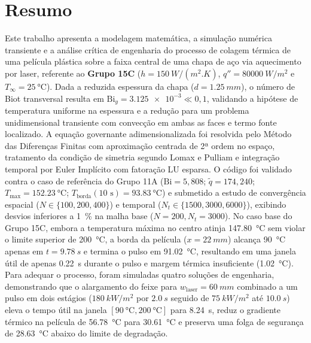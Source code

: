 \documentclass[11pt,a4paper]{article}
\begin{document}
\section{Resumo}
Este trabalho apresenta a modelagem matemática, a simulação numérica transiente e a análise crítica de engenharia do processo de colagem térmica de uma película plástica sobre a faixa central de uma chapa de aço via aquecimento por laser, referente ao \textbf{Grupo 15C} ($h = \SI{150}{W/(m^2.K)}$, $q'' = \SI{80000}{W/m^2}$ e $T_\infty = \SI{25}{\celsius}$). Dada a reduzida espessura da chapa ($d = \SI{1,25}{mm}$), o número de Biot transversal resulta em $\text{Bi}_y = \num{3,125e-3} \ll 0,1$, validando a hipótese de temperatura uniforme na espessura e a redução para um problema unidimensional transiente com convecção em ambas as faces e termo fonte localizado. A equação governante adimensionalizada foi resolvida pelo Método das Diferenças Finitas com aproximação centrada de 2ª ordem no espaço, tratamento da condição de simetria segundo Lomax e Pulliam e integração temporal por Euler Implícito com fatoração LU esparsa. O código foi validado contra o caso de referência do Grupo 11A ($\text{Bi} = 5,808$; $\tilde{q} = 174,240$; $T_{\max} = \SI{152,23}{\celsius}$; $T_{\text{borda}}(10\text{ s}) = \SI{93,83}{\celsius}$) e submetido a estudo de convergência espacial ($N \in \{100, 200, 400\}$) e temporal ($N_t \in \{1500, 3000, 6000\}$), exibindo desvios inferiores a \SI{1}{\percent} na malha base ($N=200, N_t=3000$). No caso base do Grupo 15C, embora a temperatura máxima no centro atinja \SI{147,80}{\celsius} sem violar o limite superior de \SI{200}{\celsius}, a borda da película ($x = \SI{22}{mm}$) alcança \SI{90}{\celsius} apenas em $t = \SI{9,78}{s}$ e termina o pulso em \SI{91,02}{\celsius}, resultando em uma janela útil de apenas \SI{0,22}{s} durante o pulso e margem térmica insuficiente (\SI{1,02}{\celsius}). Para adequar o processo, foram simuladas quatro soluções de engenharia, demonstrando que o alargamento do feixe para $w_{\text{laser}} = \SI{60}{mm}$ combinado a um pulso em dois estágios ($\SI{180}{kW/m^2}$ por $\SI{2,0}{s}$ seguido de $\SI{75}{kW/m^2}$ até $\SI{10,0}{s}$) eleva o tempo útil na janela $[\SI{90}{\celsius}, \SI{200}{\celsius}]$ para \SI{8,24}{s}, reduz o gradiente térmico na película de \SI{56,78}{\celsius} para \SI{30,61}{\celsius} e preserva uma folga de segurança de \SI{28,63}{\celsius} abaixo do limite de degradação.

\end{document}

